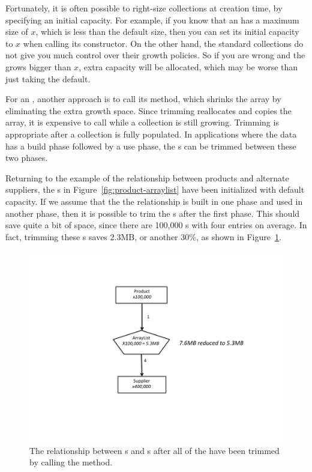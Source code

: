 Fortunately, it is often possible to right-size collections at creation
time, by specifying an initial capacity. For example, if you know that an
 has a maximum size of $x$, which is less than the default
size, then you can set its initial capacity to $x$ when calling its constructor. On the
other hand, the standard collections do not give you much control over their
growth policies. So if you are wrong and the  grows bigger than
$x$, extra capacity will be allocated, which may be worse than just taking the
default. 
 
For an , another approach is to call its 
method, which shrinks the array by eliminating the extra growth space. 
Since trimming reallocates and copies the array, it is expensive to call
 while a collection is still growing. Trimming is
appropriate after a collection is fully populated. In 
applications where the data has a build phase followed by a use phase,
the s can be trimmed between these two phases.
 
Returning to the example of the relationship between products and alternate
suppliers, the s in Figure~\ref{fig:product-arraylist} have
been initialized with default capacity. If we assume that the the relationship
is built in one phase and used in another phase, then it is possible to trim the
s after the first phase. This should save quite a bit of
space, since there are 100,000 s with four entries on
average. In fact, trimming these
s saves 2.3MB, or another 30\%, as shown in
Figure~\ref{fig:trimmed-product}. 

\begin{figure}
  \centering
 \includegraphics[width=.80\textwidth]{part1/Figures/collections/trimmed-product.pdf}
 \caption{The relationship between s and s after
 all of the
  have been trimmed by calling the  method.}
  \label{fig:trimmed-product}
\end{figure}
 

